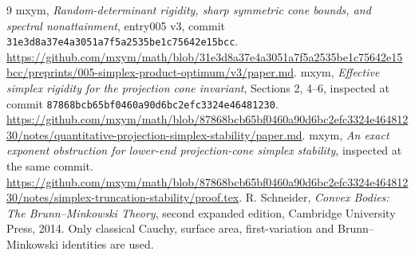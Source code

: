 \documentclass[11pt]{article}
\begin{document}
\begin{thebibliography}{9}
mxym, \emph{Random-determinant rigidity, sharp symmetric cone bounds, and
spectral nonattainment}, entry005 v3, commit
\nolinkurl{31e3d8a37e4a3051a7f5a2535be1c75642e15bcc}.
\url{https://github.com/mxym/math/blob/31e3d8a37e4a3051a7f5a2535be1c75642e15bcc/preprints/005-simplex-product-optimum/v3/paper.md}.
mxym, \emph{Effective simplex rigidity for the projection cone invariant},
Sections 2, 4--6, inspected at commit
\nolinkurl{87868bcb65bf0460a90d6bc2efc3324e46481230}.
\url{https://github.com/mxym/math/blob/87868bcb65bf0460a90d6bc2efc3324e46481230/notes/quantitative-projection-simplex-stability/paper.md}.
mxym, \emph{An exact exponent obstruction for lower-end projection-cone
simplex stability}, inspected at the same commit.
\url{https://github.com/mxym/math/blob/87868bcb65bf0460a90d6bc2efc3324e46481230/notes/simplex-truncation-stability/proof.tex}.
R. Schneider, \emph{Convex Bodies: The Brunn--Minkowski Theory},
second expanded edition, Cambridge University Press, 2014.
Only classical Cauchy, surface area, first-variation and
Brunn--Minkowski identities are used.
\end{thebibliography}
\end{document}
